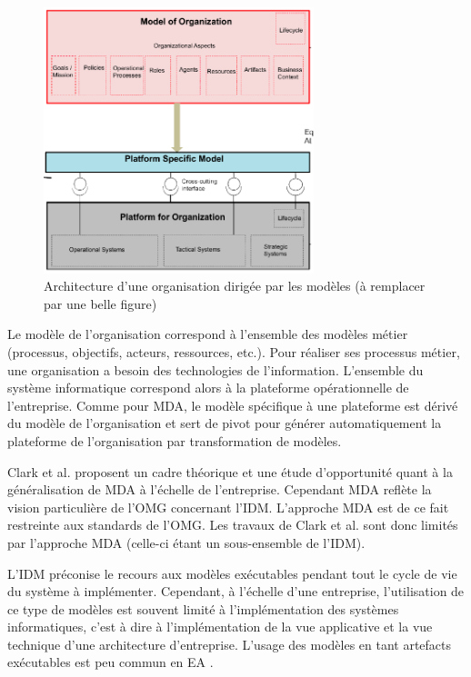 \begin{figure}[!htbp]
 \begin{center}
   \includegraphics[width=0.7\textwidth]{images/Chapitre1/mdo.png}
 \end{center}
 \caption{Architecture d'une organisation dirigée par les modèles (à remplacer par une belle figure) \protect\cite{clark_towards_2014}}
 \label{fig:mdo}
\end{figure}

Le modèle de l'organisation correspond à l'ensemble des modèles métier (processus, objectifs, acteurs, ressources, etc.). Pour réaliser ses processus métier, une organisation a besoin des technologies de l'information. L'ensemble du système informatique correspond alors à la plateforme opérationnelle de l'entreprise. Comme pour MDA, le modèle spécifique à une plateforme est dérivé du modèle de l'organisation et sert de pivot pour générer automatiquement la plateforme de l'organisation par transformation de modèles.

Clark et al. \cite{clark_towards_2014} proposent un cadre théorique et une étude d'opportunité quant à la généralisation de MDA à l'échelle de l'entreprise. Cependant MDA reflète la vision particulière de l'OMG concernant l'IDM. L'approche MDA est de ce fait restreinte aux standards de l'OMG. Les travaux de Clark et al. sont donc limités par l'approche MDA (celle-ci étant un sous-ensemble de l'IDM).

L'IDM préconise le recours aux modèles exécutables pendant tout le cycle de vie du système à implémenter. Cependant, à l'échelle d'une entreprise, l'utilisation de ce type de modèles est souvent limité à l'implémentation des systèmes informatiques, c'est à dire à l'implémentation de la vue applicative et la vue technique d'une architecture d'entreprise. L'usage des modèles en tant artefacts exécutables est peu commun en EA \cite{kulkarni_modelling_2013}.


